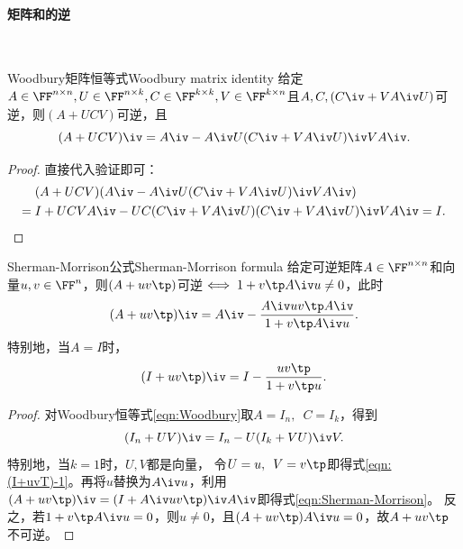 \paragraph{矩阵和的逆}

~

\begin{theorem}
	{Woodbury矩阵恒等式}{Woodbury matrix identity}
	给定$A\in\FF^{n\times n},U\in\FF^{n\times k},C\in\FF^{k\times k},V\in\FF^{k\times n}$且$A,C,(C\iv+VA\iv U)$可逆，则$(A+UCV)$可逆，且 
	\begin{equation}
		\label{eqn:Woodbury}
		(A+UCV)\iv=A\iv-A\iv U(C\iv+VA\iv U)\iv VA\iv.
	\end{equation}
\end{theorem}
\begin{proof}
	直接代入验证即可：
	\begin{align*}
		&(A+UCV)(A\iv-A\iv U(C\iv+VA\iv U)\iv VA\iv)\\
		={}&I+UCVA\iv-UC(C\iv+VA\iv U)(C\iv+VA\iv U)\iv VA\iv=I.
		\qedhere
	\end{align*}
\end{proof}

\begin{theorem}
	{Sherman-Morrison公式}{Sherman-Morrison formula}
	给定可逆矩阵$A\in\FF^{n\times n}$和向量$u,v\in\FF^n$，则$(A+uv\tp)$可逆$\iff 1+v\tp A\iv u\neq 0$，此时
	\begin{equation}
		\label{eqn:Sherman-Morrison}
		(A+uv\tp)\iv=A\iv-\frac{A\iv uv\tp A\iv}{1+v\tp A\iv u}.
	\end{equation}
	特别地，当$A=I$时，
	\begin{equation}
		\label{eqn:(I+uvT)-1}
		(I+uv\tp)\iv=I-\frac{uv\tp}{1+v\tp u}.
	\end{equation}
\end{theorem}
\begin{proof}
	对Woodbury恒等式\eqref{eqn:Woodbury}取$A=I_n,\enspace C=I_k$，得到
	\begin{equation}
		\label{eqn:(I+UVT)-1}
		(I_n+UV)\iv=I_n-U(I_k+VU)\iv V.
	\end{equation}
	特别地，当$k=1$时，$U,V$都是向量，
	令$U=u,\enspace V=v\tp$即得式\eqref{eqn:(I+uvT)-1}。再将$u$替换为$A\iv u$，利用$(A+uv\tp)\iv=(I+A\iv uv\tp)\iv A\iv$即得式\eqref{eqn:Sherman-Morrison}。
	反之，若$1+v\tp A\iv u=0$，则$u\neq0$，且$(A+uv\tp)A\iv u=0$，故$A+uv\tp$不可逆。
\end{proof}

